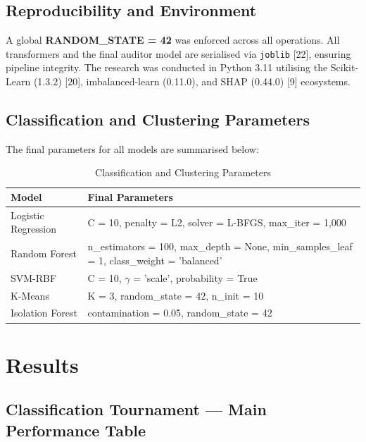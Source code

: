 \documentclass[conference]{IEEEtran}
\begin{document}
\subsection{Reproducibility and Environment}
A global \textbf{RANDOM\_STATE = 42} was enforced across all operations. All transformers and the final auditor model are serialised via \texttt{joblib} [22], ensuring pipeline integrity. The research was conducted in Python 3.11 utilising the Scikit-Learn (1.3.2) [20], imbalanced-learn (0.11.0), and SHAP (0.44.0) [9] ecosystems.

\subsection{Classification and Clustering Parameters}
The final parameters for all models are summarised below:

\begin{table}[htbp]
\caption{Classification and Clustering Parameters}
\begin{center}
\begin{tabularx}{\columnwidth}{|l|X|}
\hline
\textbf{Model} & \textbf{Final Parameters} \\ \hline
Logistic Regression & C = 10, penalty = L2, solver = L-BFGS, max\_iter = 1,000 \\ \hline
Random Forest & n\_estimators = 100, max\_depth = None, min\_samples\_leaf = 1, class\_weight = 'balanced' \\ \hline
SVM-RBF & C = 10, $\gamma$ = 'scale', probability = True \\ \hline
K-Means & K = 3, random\_state = 42, n\_init = 10 \\ \hline
Isolation Forest & contamination = 0.05, random\_state = 42 \\ \hline
\end{tabularx}
\end{center}
\end{table}

\section{Results}
\subsection{Classification Tournament — Main Performance Table}
\end{document}
